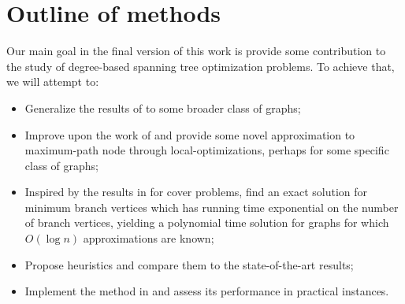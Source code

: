 \documentclass[12pt]{article}
\begin{document}
\section{Outline of methods} \label{sec:methods}

Our main goal in the final version of this work is provide some contribution to the study of degree-based spanning tree optimization problems.
To achieve that, we will attempt to:

\begin{itemize}
  \item Generalize the results of \cite{salamon2010} to some broader class of graphs;
  \item Improve upon the work of \cite{chimani2015} and provide some novel approximation to maximum-path node through local-optimizations, perhaps for some specific class of graphs;
  \item Inspired by the results in \cite{karpinski1996} for cover problems, find an exact solution for minimum branch vertices which has running time exponential on the number of branch vertices, yielding a polynomial time solution for graphs for which $O(\log n)$ approximations are known;
  \item Propose heuristics and compare them to the state-of-the-art results;
  \item Implement the method in \cite{salamon2010} and assess its performance in practical instances.
\end{itemize}



\end{document}
